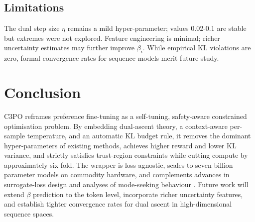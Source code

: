 \documentclass{article}
\begin{document}
\subsection{Limitations}
The dual step size \(\eta\) remains a mild hyper-parameter; values 0.02-0.1 are stable but extremes were not explored. Feature engineering is minimal; richer uncertainty estimates may further improve \(\beta_i\). While empirical KL violations are zero, formal convergence rates for sequence models merit future study.

\section{Conclusion}
C3PO reframes preference fine-tuning as a self-tuning, safety-aware constrained optimisation problem. By embedding dual-ascent theory, a context-aware per-sample temperature, and an automatic KL budget rule, it removes the dominant hyper-parameters of existing methods, achieves higher reward and lower KL variance, and strictly satisfies trust-region constraints while cutting compute by approximately six-fold. The wrapper is loss-agnostic, scales to seven-billion-parameter models on commodity hardware, and complements advances in surrogate-loss design \cite{lu-2024-discovering,shao-2024-language} and analyses of mode-seeking behaviour \cite{tajwar-2024-preference}. Future work will extend \(\beta\) prediction to the token level, incorporate richer uncertainty features, and establish tighter convergence rates for dual ascent in high-dimensional sequence spaces.




\end{document}
